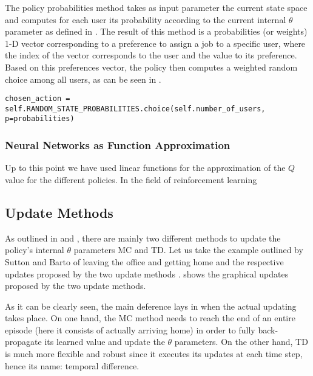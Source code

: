 \documentclass{seal_thesis}
\begin{document}
The policy probabilities method takes as input parameter the current state space and computes for each user its probability according to the current internal $\theta$ parameter as defined in . The result of this method is a probabilities (or weights) 1-D vector corresponding to a preference to assign a job to a specific user, where the index of the vector corresponds to the user and the value to its preference. Based on this preferences vector, the policy then computes a weighted random choice among all users, as can be seen in .

\begin{lstlisting}[caption=Probabilistic user choice,label=lst:prob_user_choice,style=CustomPython]
	chosen_action = self.RANDOM_STATE_PROBABILITIES.choice(self.number_of_users, p=probabilities)
\end{lstlisting}

\subsubsection{Neural Networks as Function Approximation}

Up to this point we have used linear functions for the approximation of the $Q$ value for the different policies. In the field of reinforcement learning

\subsection{Update Methods}

As outlined in  and , there are mainly two different methods to update the policy's internal $\theta$ parameters \ie MC and TD. Let us take the example outlined by Sutton and Barto of leaving the office and getting home and the respective updates proposed by the two update methods \cite[p. 130]{Sutton2017}.  shows the graphical updates proposed by the two update methods.


As it can be clearly seen, the main deference lays in when the actual updating takes place. On one hand, the MC method needs to reach the end of an entire episode (\ie here it consists of actually arriving home) in order to fully back-propagate its learned value and update the $\theta$ parameters. On the other hand, TD is much more flexible and robust since it executes its updates at each time step, hence its name: temporal difference.
\end{document}
